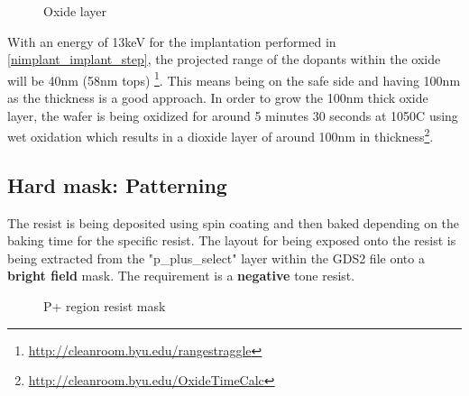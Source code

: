 \begin{figure}[H]
	\centering
	\begin{tikzpicture}[node distance = 3cm, auto, thick,scale=\CrossSectionOnly, every node/.style={transform shape}]
		
	\end{tikzpicture}
	\begin{tikzpicture}[node distance = 3cm, auto, thick,scale=\CrossSectionOnly, every node/.style={transform shape}]
		
	\end{tikzpicture}
	\caption{Oxide layer}
\end{figure}

With an energy of 13keV for the implantation performed in \autoref{nimplant_implant_step}, the projected range of the dopants within the oxide will be 40nm (58nm tops) \footnote{\url{http://cleanroom.byu.edu/rangestraggle}}.
This means being on the safe side and having 100nm as the thickness is a good approach.
In order to grow the 100nm thick oxide layer, the wafer is being oxidized for around 5 minutes 30 seconds at 1050\degree C using wet oxidation which results in a dioxide layer of around 100nm in thickness\footnote{\url{http://cleanroom.byu.edu/OxideTimeCalc}}.

\subsection{Hard mask: Patterning}

The resist is being deposited using spin coating and then baked depending on the baking time for the specific resist.
The layout for being exposed onto the resist is being extracted from the "p\_plus\_select" layer within the GDS2 file onto a \textbf{bright field} mask.
The requirement is a \textbf{negative} tone resist.

\begin{figure}[H]
	\centering
	\begin{tikzpicture}[node distance = 3cm, auto, thick,scale=\CrossAndTopSection, every node/.style={transform shape}]
		
	\end{tikzpicture}
	\begin{tikzpicture}[node distance = 3cm, auto, thick,scale=\CrossAndTopSection, every node/.style={transform shape}]
		
	\end{tikzpicture}
	\begin{tikzpicture}[node distance = 3cm, auto, thick,scale=\CrossAndTopSection, every node/.style={transform shape}]
		
	\end{tikzpicture}
	\begin{tikzpicture}[node distance = 3cm, auto, thick,scale=\CrossAndTopSection, every node/.style={transform shape}]
		
	\end{tikzpicture}
	\caption{P+ region resist mask}
\end{figure}

